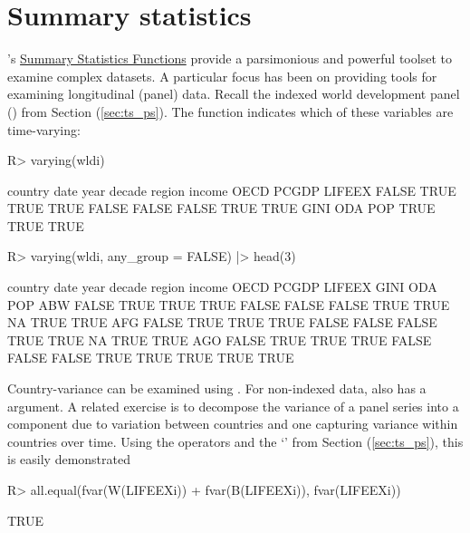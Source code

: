 \documentclass[article]{jss}
\newcommand{\class}[1]{`\code{#1}'}
\newcommand{\fct}[1]{\code{#1()}}
\begin{document}
\section{Summary statistics} \label{sec:summ_stat}
%
's \href{https://sebkrantz.github.io/collapse/reference/summary-statistics.html}{Summary Statistics Functions} provide a parsimonious and powerful toolset to examine complex datasets. A particular focus has been on providing tools for examining longitudinal (panel) data. Recall the indexed world development panel () from Section (\ref{sec:ts_ps}). The function \fct{varying} indicates which of these variables are time-varying:
%
\begin{Schunk}
\begin{Sinput}
R> varying(wldi)
\end{Sinput}
\begin{Soutput}
country    date    year  decade  region  income    OECD   PCGDP  LIFEEX 
  FALSE    TRUE    TRUE    TRUE   FALSE   FALSE   FALSE    TRUE    TRUE 
   GINI     ODA     POP 
   TRUE    TRUE    TRUE 
\end{Soutput}
\begin{Sinput}
R> varying(wldi, any_group = FALSE) |> head(3)
\end{Sinput}
\begin{Soutput}
    country date year decade region income  OECD PCGDP LIFEEX GINI  ODA  POP
ABW   FALSE TRUE TRUE   TRUE  FALSE  FALSE FALSE  TRUE   TRUE   NA TRUE TRUE
AFG   FALSE TRUE TRUE   TRUE  FALSE  FALSE FALSE  TRUE   TRUE   NA TRUE TRUE
AGO   FALSE TRUE TRUE   TRUE  FALSE  FALSE FALSE  TRUE   TRUE TRUE TRUE TRUE
\end{Soutput}
\end{Schunk}
%
Country-variance can be examined using . For non-indexed data, \fct{varying} also has a  argument. A related exercise is to decompose the variance of a panel series into a component due to variation between countries and one capturing variance within countries over time. Using the  operators and the  \class{indexed\_series} from Section (\ref{sec:ts_ps}), this is easily demonstrated
%
\begin{Schunk}
\begin{Sinput}
R> all.equal(fvar(W(LIFEEXi)) + fvar(B(LIFEEXi)), fvar(LIFEEXi))
\end{Sinput}
\begin{Soutput}
[1] TRUE
\end{Soutput}
\end{Schunk}
\end{document}
